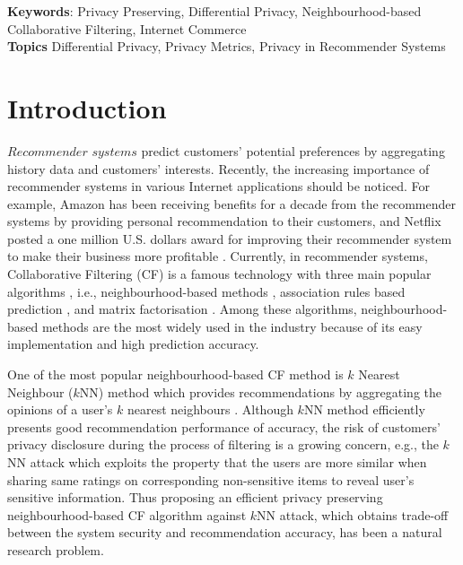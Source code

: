 \documentclass[11pt]{article}
\begin{document}
{\bf Keywords}: Privacy Preserving, Differential Privacy, Neighbourhood-based Collaborative Filtering, Internet Commerce
~\\

{\bf Topics} Differential Privacy, Privacy Metrics, Privacy in Recommender Systems
~\\


\section{Introduction}
\label{INTRO}

$Recommender$ $systems$ predict customers' potential preferences by aggregating history data and customers' interests. Recently, the increasing importance of recommender systems in various Internet applications should be noticed. For example, Amazon has been receiving benefits for a decade from the recommender systems by providing personal recommendation to their customers, and Netflix posted a one million U.S. dollars award for improving their recommender system to make their business more profitable \cite{SCHAFER1999, EKSTRAND2011, KABBUR2013}. Currently, in recommender systems, Collaborative Filtering (CF) is a famous technology with three main popular algorithms \cite{LIU2011}, i.e., neighbourhood-based methods \cite{EKSTRAND2011}, association rules based prediction \cite{HERLOCKER2002}, and matrix factorisation \cite{KOREN2009}. Among these algorithms, neighbourhood-based methods are the most widely used in the industry because of its easy implementation and high prediction accuracy.

One of the most popular neighbourhood-based CF method is $k$ Nearest Neighbour ($k$NN) method which provides recommendations by aggregating the opinions of a user's $k$ nearest neighbours \cite{ADOMAVICIUS2005}. Although $k$NN method efficiently presents good recommendation performance of accuracy, the risk of customers' privacy disclosure during the process of filtering is a growing concern, e.g., the $k$NN attack \cite{CALANDRINO2011} which exploits the property that the users are more similar when sharing same ratings on corresponding non-sensitive items to reveal user's sensitive information. Thus proposing an efficient privacy preserving neighbourhood-based CF algorithm against $k$NN attack, which obtains trade-off between the system security and recommendation accuracy, has been a natural research problem.
\end{document}
